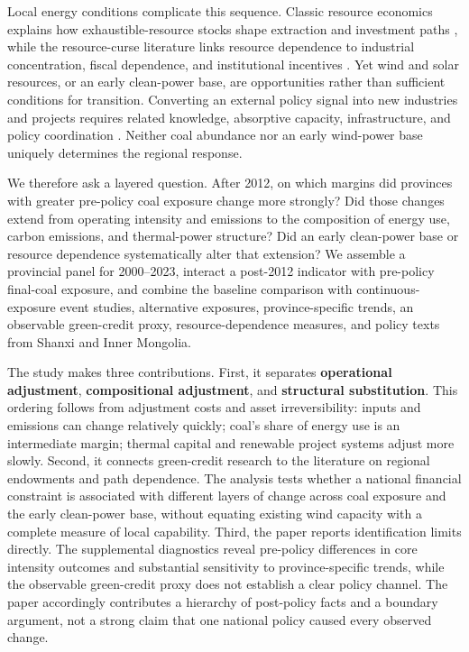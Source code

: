 \documentclass[11pt]{article}
\begin{document}
Local energy conditions complicate this sequence. Classic resource economics explains how exhaustible-resource stocks shape extraction and investment paths \parencite{hotelling1931}, while the resource-curse literature links resource dependence to industrial concentration, fiscal dependence, and institutional incentives \parencite{auty1993,sachswarner2001}. Yet wind and solar resources, or an early clean-power base, are opportunities rather than sufficient conditions for transition. Converting an external policy signal into new industries and projects requires related knowledge, absorptive capacity, infrastructure, and policy coordination \parencite{cohenlevinthal1990,hidalgoetal2007,neffkeetal2011,boschma2017,hansencoenen2015}. Neither coal abundance nor an early wind-power base uniquely determines the regional response.

We therefore ask a layered question. After 2012, on which margins did provinces with greater pre-policy coal exposure change more strongly? Did those changes extend from operating intensity and emissions to the composition of energy use, carbon emissions, and thermal-power structure? Did an early clean-power base or resource dependence systematically alter that extension? We assemble a provincial panel for 2000--2023, interact a post-2012 indicator with pre-policy final-coal exposure, and combine the baseline comparison with continuous-exposure event studies, alternative exposures, province-specific trends, an observable green-credit proxy, resource-dependence measures, and policy texts from Shanxi and Inner Mongolia.

The study makes three contributions. First, it separates \textbf{operational adjustment}, \textbf{compositional adjustment}, and \textbf{structural substitution}. This ordering follows from adjustment costs and asset irreversibility: inputs and emissions can change relatively quickly; coal's share of energy use is an intermediate margin; thermal capital and renewable project systems adjust more slowly. Second, it connects green-credit research to the literature on regional endowments and path dependence. The analysis tests whether a national financial constraint is associated with different layers of change across coal exposure and the early clean-power base, without equating existing wind capacity with a complete measure of local capability. Third, the paper reports identification limits directly. The supplemental diagnostics reveal pre-policy differences in core intensity outcomes and substantial sensitivity to province-specific trends, while the observable green-credit proxy does not establish a clear policy channel. The paper accordingly contributes a hierarchy of post-policy facts and a boundary argument, not a strong claim that one national policy caused every observed change.
\end{document}
